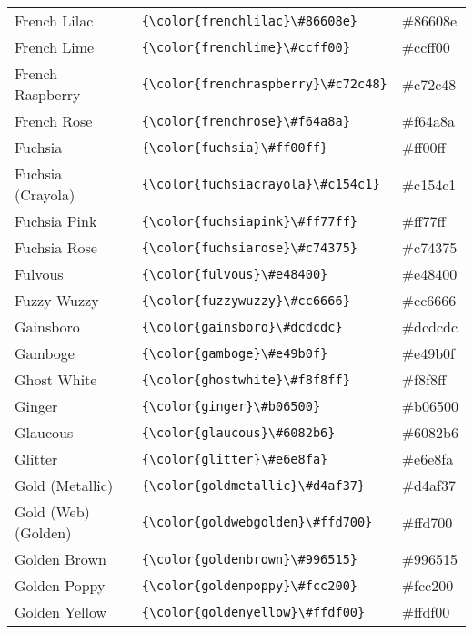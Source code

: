 \documentclass[9.5pt]{article}
\begin{document}
\begin{longtable}{l | l | l}
	French Lilac & \verb!{\color{frenchlilac}\#86608e}! & {\color{frenchlilac}\#86608e}\\
	French Lime & \verb!{\color{frenchlime}\#ccff00}! & {\color{frenchlime}\#ccff00}\\
	French Raspberry & \verb!{\color{frenchraspberry}\#c72c48}! & {\color{frenchraspberry}\#c72c48}\\
	French Rose & \verb!{\color{frenchrose}\#f64a8a}! & {\color{frenchrose}\#f64a8a}\\
	Fuchsia & \verb!{\color{fuchsia}\#ff00ff}! & {\color{fuchsia}\#ff00ff}\\
	Fuchsia (Crayola) & \verb!{\color{fuchsiacrayola}\#c154c1}! & {\color{fuchsiacrayola}\#c154c1}\\
	Fuchsia Pink & \verb!{\color{fuchsiapink}\#ff77ff}! & {\color{fuchsiapink}\#ff77ff}\\
	Fuchsia Rose & \verb!{\color{fuchsiarose}\#c74375}! & {\color{fuchsiarose}\#c74375}\\
	Fulvous & \verb!{\color{fulvous}\#e48400}! & {\color{fulvous}\#e48400}\\
	Fuzzy Wuzzy & \verb!{\color{fuzzywuzzy}\#cc6666}! & {\color{fuzzywuzzy}\#cc6666}\\
	Gainsboro & \verb!{\color{gainsboro}\#dcdcdc}! & {\color{gainsboro}\#dcdcdc}\\
	Gamboge & \verb!{\color{gamboge}\#e49b0f}! & {\color{gamboge}\#e49b0f}\\
	Ghost White & \verb!{\color{ghostwhite}\#f8f8ff}! & {\color{ghostwhite}\#f8f8ff}\\
	Ginger & \verb!{\color{ginger}\#b06500}! & {\color{ginger}\#b06500}\\
	Glaucous & \verb!{\color{glaucous}\#6082b6}! & {\color{glaucous}\#6082b6}\\
	Glitter & \verb!{\color{glitter}\#e6e8fa}! & {\color{glitter}\#e6e8fa}\\
	Gold (Metallic) & \verb!{\color{goldmetallic}\#d4af37}! & {\color{goldmetallic}\#d4af37}\\
	Gold (Web) (Golden) & \verb!{\color{goldwebgolden}\#ffd700}! & {\color{goldwebgolden}\#ffd700}\\
	Golden Brown & \verb!{\color{goldenbrown}\#996515}! & {\color{goldenbrown}\#996515}\\
	Golden Poppy & \verb!{\color{goldenpoppy}\#fcc200}! & {\color{goldenpoppy}\#fcc200}\\
	Golden Yellow & \verb!{\color{goldenyellow}\#ffdf00}! & {\color{goldenyellow}\#ffdf00}\\

\end{longtable}
\end{document}
